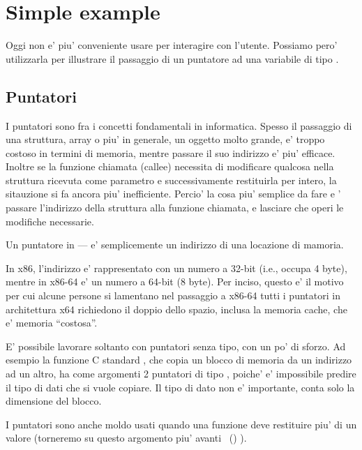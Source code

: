 \section{Simple example}



Oggi non e' piu' conveniente usare \scanf per interagire con l'utente. 
Possiamo pero' utilizzarla per illustrare il passaggio di un puntatore ad una variabile di tipo \Tint.

\subsection{Puntatori}
\myindex{\CLanguageElements!\Pointers}

I puntatori sono fra i concetti fondamentali in informatica.
Spesso il passaggio di una struttura, array o piu' in generale, un oggetto molto grande, e' troppo costoso in termini di memoria, mentre passare il suo indirizzo e' piu' efficace. 
Inoltre se la funzione chiamata (\gls{callee}) necessita di modificare qualcosa nella struttura ricevuta come parametro e successivamente restituirla per intero, la sitauzione si fa ancora piu' inefficiente.
Percio' la cosa piu' semplice da fare e ' passare l'indirizzo della struttura alla funzione chiamata, e lasciare che operi le modifiche necessarie.

Un puntatore in \CCpp--- e' semplicemente un indirizzo di una locazione di mamoria.

In x86, l'indirizzo e' rappresentato con un numero a 32-bit (i.e., occupa 4 byte), mentre in x86-64 e' un numero a 64-bit (8 byte).
Per inciso, questo e' il motivo per cui alcune persone si lamentano nel passaggio a x86-64\EMDASH{} tutti i puntatori in architettura x64 richiedono il doppio dello spazio, inclusa la memoria cache, che e' memoria ``costosa''.

E' possibile lavorare soltanto con puntatori senza tipo, con un po' di sforzo. Ad esempio la funzione C standard , che copia un blocco di memoria da un indirizzo ad un altro, ha come argomenti 2 puntatori di tipo , poiche' e' impossibile predire il tipo di dati che si vuole copiare. Il tipo di dato non e' importante, conta solo la dimensione del blocco.

I puntatori sono anche moldo usati quando una funzione deve restituire piu' di un valore
(torneremo su questo argomento piu' avanti
~()
).

